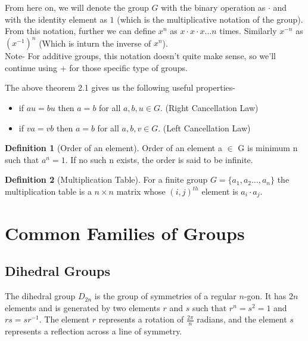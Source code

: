 \documentclass[12pt,a4paper,oneside]{report}
\theoremstyle{definition}
\newtheorem{definition}{Definition}[chapter]
\begin{document}
From here on, we will denote the group $G$ with the binary operation as $\cdot$ and with the identity element as $1$ (which is the multiplicative notation of the group). From this notation, further we can define $x^{n}$ as $x \cdot x \cdot x \ldots n$ times. Similarly $x^{-n}$ as $(x^{-1})^{n}$ (Which is inturn the inverse of $x^n$). 
\\Note- For additive groups, this notation doesn't quite make sense, so we'll continue using + for those specific type of groups.

The above theorem 2.1 gives us the following useful properties-
\begin{itemize}
  \item if $au=bu$ then $a=b$ for all $a,b,u \in G$. (Right Cancellation Law)
  \item if $va=vb$ then $a=b$ for all $a,b,v \in G$. (Left Cancellation Law)
\end{itemize}
\begin{definition}[Order of an element]
  Order of an element a $\in$ G is minimum n such that $a^{n}=1$. If no such n exists, the order is said to be infinite.
\end{definition}
\begin{definition}[Multiplication Table]
  For a finite group $G=\{a_1,a_2\ldots,a_n\}$ the multiplication table is a $n \times n$ matrix whose $(i,j)^{th}$ element is $a_i \cdot a_j$.
\end{definition}
\chapter{Common Families of Groups}
\section{Dihedral Groups}
The dihedral group $D_{2n}$ is the group of symmetries of a regular $n$-gon. It has $2n$ elements and is generated by two elements $r$ and $s$ such that $r^{n} = s^{2} = 1$ and $rs = sr^{-1}$. The element $r$ represents a rotation of $\frac{2\pi}{n}$ radians, and the element $s$ represents a reflection across a line of symmetry. 
\end{document}
